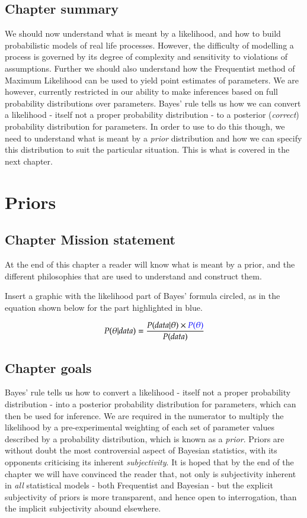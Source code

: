 \documentclass[11pt,fullpage]{book}
\begin{document}
\section{Chapter summary}
We should now understand what is meant by a likelihood, and how to build probabilistic models of real life processes. However, the difficulty of modelling a process is governed by its degree of complexity and sensitivity to violations of assumptions. Further we should also understand how the Frequentist method of Maximum Likelihood can be used to yield point estimates of parameters. We are however, currently restricted in our ability to make inferences based on full probability distributions over parameters. Bayes' rule tells us how we can convert a likelihood - itself not a proper probability distribution - to a posterior (\textit{correct}) probability distribution for parameters. In order to use to do this though, we need to understand what is meant by a \textit{prior} distribution and how we can specify this distribution to suit the particular situation. This is what is covered in the next chapter.

\chapter{Priors}\label{chap:Prior}
\section{Chapter Mission statement}
At the end of this chapter a reader will know what is meant by a prior, and the different philosophies that are used to understand and construct them. 

Insert a graphic with the likelihood part of Bayes' formula circled, as in the equation shown below for the part highlighted in blue.

\begin{equation}
P(\theta|data) = \frac{P(data|\theta)\times {\color{blue}P(\theta)}}{P(data)}
\end{equation}\label{eq:Prior_BayesHighlighted}

\section{Chapter goals}
Bayes' rule tells us how to convert a likelihood - itself not a proper probability distribution - into a posterior probability distribution for parameters, which can then be used for inference. We are required in the numerator to multiply the likelihood by a pre-experimental weighting of each set of parameter values described by a probability distribution, which is known as a \textit{prior}. Priors are without doubt the most controversial aspect of Bayesian statistics, with its opponents criticising its inherent \textit{subjectivity}. It is hoped that by the end of the chapter we will have convinced the reader that, not only is subjectivity inherent in \textit{all} statistical models - both Frequentist and Bayesian - but the explicit subjectivity of priors is more transparent, and hence open to interrogation, than the implicit subjectivity abound elsewhere.
\end{document}
